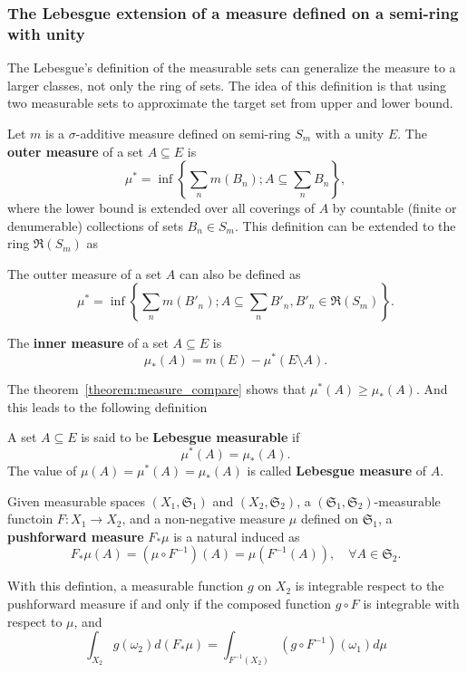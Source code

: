 \subsubsection{The Lebesgue extension of a measure defined on a semi-ring with unity}

The Lebesgue's definition of the measurable sets can generalize the measure to a larger classes, not only the ring of sets. The idea of this definition is that using two measurable sets to approximate the target set from upper and lower bound. 

\begin{definition}
Let $m$ is a $\sigma$-additive measure defined on semi-ring $S_m$ with a unity $E$. 
The \textbf{outer measure} of a set $A\subseteq E$ is
\begin{equation}
\mu^*=\inf\left\{\sum_nm(B_n);A\subseteq\sum_nB_n\right\},
\end{equation} 
where the lower bound is extended over all coverings of $A$ by countable (finite or denumerable) collections of sets $B_n\in S_m$. This definition can be extended to the ring $\mathfrak{R}(S_m)$ as

The outter measure of a set $A$ can also be defined as
\begin{equation}
\mu^*=\inf\left\{\sum_nm(B'_n);A\subseteq\sum_nB'_n,B'_n\in\mathfrak{R}(S_m)\right\}.
\end{equation}

The \textbf{inner measure} of a set $A\subseteq E$ is
\begin{equation}
\mu_*(A)=m(E)-\mu^*(E\setminus A).
\end{equation}
\end{definition}

The theorem~\ref{theorem:measure_compare} shows that $\mu^*(A)\ge\mu_*(A)$. And this leads to the following definition
\begin{definition}
A set $A\subseteq E$ is said to be \textbf{Lebesgue measurable} if
\begin{equation}
\mu^*(A)=\mu_*(A).
\end{equation}
The value of $\mu(A)=\mu^*(A)=\mu_*(A)$ is called \textbf{Lebesgue measure} of $A$.
\end{definition}

\begin{definition}
Given measurable spaces $(X_1,\mathfrak{S}_1)$ and $(X_2,\mathfrak{S}_2)$, a $(\mathfrak{S}_1,\mathfrak{S}_2)$-measurable functoin $F:X_1\to X_2$, and a non-negative measure $\mu$ defined on $\mathfrak{S}_1$, a \textbf{pushforward measure} $F_*\mu$ is a natural induced as
\begin{equation}
F_*\mu(A) = (\mu\circ F^{-1})(A)=\mu\left(F^{-1}(A)\right), \quad \forall A\in\mathfrak{S}_2.
\end{equation} 
\end{definition}
With this defintion, a measurable function $g$ on $X_2$ is integrable respect to the pushforward measure if and only if the composed function $g\circ F$ is integrable with respect to $\mu$, and
\begin{equation}
\int_{X_2}g(\omega_2)d(F_*\mu) = \int_{F^{-1}(X_2)}(g\circ F^{-1})(\omega_1) d\mu
\end{equation}
